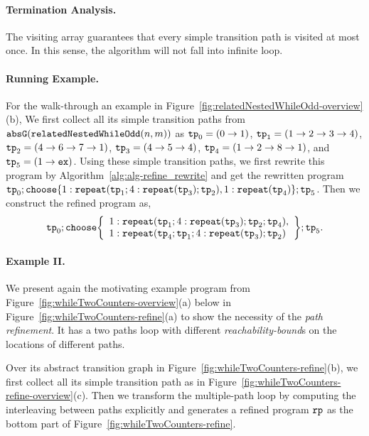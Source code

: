 \paragraph{Termination Analysis.}
The visiting array guarantees that every simple transition path is visited at most once.
In this sense, the algorithm will not fall into infinite loop.



\paragraph{Running Example.}
For the walk-through an example in Figure~\ref{fig:relatedNestedWhileOdd-overview}(b),
We first collect all its simple transition paths from $\mathtt{abs}{\mathtt{G}}(\mathtt{relatedNestedWhileOdd}(n, m))$ as
$\mathtt{tp}_0 = (0 \to 1)$,
$\mathtt{tp}_1 = (1 \to 2 \to 3 \to 4)$,
$\mathtt{tp}_2 = (4 \to 6 \to 7 \to 1)$,
$\mathtt{tp}_3 = (4 \to 5 \to 4)$, $\mathtt{tp}_4 = (1 \to 2 \to 8 \to 1)$, and $\mathtt{tp}_5 = (1 \to \mathtt{ex})$.
Using these simple transition paths, we first rewrite this program by Algorithm~\ref{alg:alg-refine_rewrite} and get the rewritten program
$ \tpath_0 ; \rpchoose{ 1: \rprepeat(\tpath_1; 4:\rprepeat(\tpath_3); \tpath_2), 
1: \rprepeat(\tpath_4) }; \tpath_5$.
Then we construct the refined program as,
\[
 \tpath_0 ; \rpchoose{ 
 \begin{array}{l}
 1: \rprepeat(\tpath_1; 4:\rprepeat(\tpath_3); \tpath_2; \tpath_4), \\
 1: \rprepeat(\tpath_4; \tpath_1; 4:\rprepeat(\tpath_3); \tpath_2) 
 \end{array}
 }; \tpath_5.
\]

\paragraph{Example II.}
We present again the motivating example program from Figure~\ref{fig:whileTwoCounters-overview}(a)
below in Figure~\ref{fig:whileTwoCounters-refine}(a)
to show the necessity of the \emph{path refinement}. 
It has a two paths loop
with different \emph{reachability-bound}s on the locations of different paths.
%
%

%
Over its abstract transition graph in Figure~\ref{fig:whileTwoCounters-refine}(b), we first collect all its simple transition path as in Figure~\ref{fig:whileTwoCounters-refine-overview}(c).
Then we transform the multiple-path loop by computing the interleaving between paths explicitly and
generates a refined program $\mathtt{rp}$ as the bottom part of Figure~\ref{fig:whileTwoCounters-refine}.

